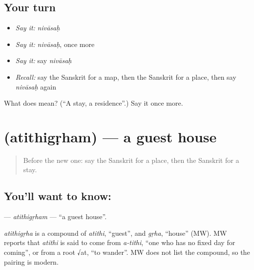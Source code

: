 \subsection*{Your turn}
\begin{itemize}
\raggedright
  \item \emph{Say it:} \emph{nivāsaḥ}
  \item \emph{Say it:} \emph{nivāsaḥ}, once more
  \item \emph{Say it:} say \emph{nivāsaḥ}
  \item \emph{Recall:} say the Sanskrit for a map, then the Sanskrit for a place, then say \emph{nivāsaḥ} again
\end{itemize}

\begin{tcolorbox}[breakable,colback=teal!4,colframe=teal!35!black,title={Before you move on}]
What does  mean? (\textquotedblleft{}A stay, a residence\textquotedblright{}.) Say it once more.
\end{tcolorbox}
\section[\texorpdfstring{\sk{अतिथिगृहम्} (atithigṛham)}{अतिथिगृहम् (atithigṛham)}]{ (atithigṛham) — a guest house}

\label{lesson:SA-C231-atithigrham}



\begin{quote}
Before the new one: say the Sanskrit for a place, then the Sanskrit for a stay.
\end{quote}

\subsection*{You'll want to know: }
\textbf{} — \emph{atithigṛham} — \textquotedblleft{}a guest house\textquotedblright{}.

\begin{cousinweb}
\emph{atithigṛha} is a compound of \emph{atithi}, \textquotedblleft{}guest\textquotedblright{}, and \emph{gṛha}, \textquotedblleft{}house\textquotedblright{} (MW). MW reports that \emph{atithi} is said to come from \emph{a-tithi}, \textquotedblleft{}one who has no fixed day for coming\textquotedblright{}, or from a root √at, \textquotedblleft{}to wander\textquotedblright{}. MW does not list the compound, so the pairing is modern.
\end{cousinweb}

